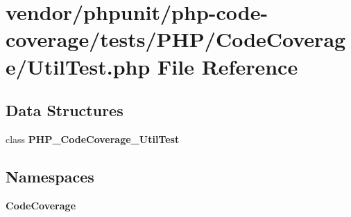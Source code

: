 \section{vendor/phpunit/php-\/code-\/coverage/tests/\+P\+H\+P/\+Code\+Coverage/\+Util\+Test.php File Reference}
\label{_util_test_8php}
\subsection*{Data Structures}
\begin{DoxyCompactItemize}
\item 
class {\bf P\+H\+P\+\_\+\+Code\+Coverage\+\_\+\+Util\+Test}
\end{DoxyCompactItemize}
\subsection*{Namespaces}
\begin{DoxyCompactItemize}
\item 
 {\bf Code\+Coverage}
\end{DoxyCompactItemize}

